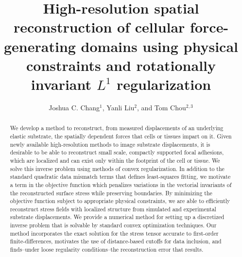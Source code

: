 \documentclass[aps,prl,reprint,twocolumn,groupedaddress,showpacs]{revtex4}
\begin{document}
\title{High-resolution spatial reconstruction of cellular
  force-generating domains using physical constraints and rotationally invariant $L^{1}$
  regularization}

\author{Joshua C. Chang$^{1}$, Yanli Liu$^{2}$, and Tom Chou$^{2,3}$}
 





\begin{abstract}
We develop a method to reconstruct, from measured displacements of an
underlying elastic substrate, the spatially dependent forces that
cells or tissues impart on it.  Given newly available high-resolution
methods to image substrate displacements, it is desirable to be able
to reconstruct small scale, compactly supported focal adhesions, which
are localized and can exist only within the footprint of the cell or
tissue.  We solve this inverse problem using methods of convex
regularization. In addition to the standard quadratic data mismatch
terms that defines least-squares fitting, we motivate a term in the
objective function which penalizes variations in the vectorial invariants
of the reconstructed surface stress while preserving boundaries.  By
minimizing the objective function subject to appropriate physical
constraints, we are able to efficiently reconstruct stress fields with
localized structure from simulated and experimental substrate
displacements. We provide a numerical method for setting up a
discretized inverse problem that is solvable by standard convex
optimization techniques. Our method incorporates the exact solution
for the stress tensor accurate to first-order finite-differences,
motivates the use of distance-based cutoffs for data inclusion, and
finds--under loose regularity conditions--the reconstruction error
that results.
\end{abstract}
\maketitle
\end{document}

